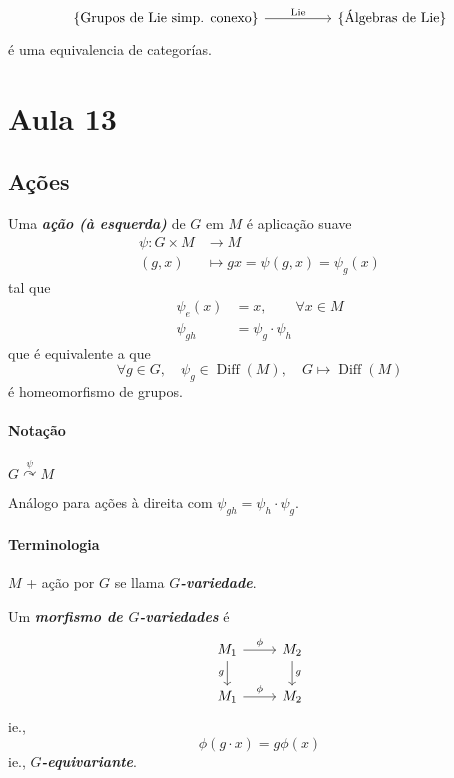 \[\begin{tikzcd}
	\{\text{Grupos de Lie simp. conexo} \} \arrow[rr,"\text{Lie} "]&&\{\text{\'Algebras de Lie} \}
\end{tikzcd}\]
\'e uma equivalencia de categor\'ias.


\section{Aula 13}

\subsection{Ações}

\begin{defn}
	Uma \textbf{\textit{ação (à esquerda)} } de $G$ em $M$ é aplicação suave
	\begin{align*}
		\psi: G\times M &\longrightarrow M \\
		(g,x) &\longmapsto gx=\psi(g,x)= \psi_{g}(x)
	\end{align*}
	tal que
	\begin{align*}
		\psi_e(x)&=x,\qquad \forall x\in M\\
		\psi_{gh}&=\psi_g\cdot \psi_h
	\end{align*}
	 que é equivalente a que
	\[\forall g\in G, \quad \psi_g\in\operatorname{Diff}(M), \quad G\mapsto \operatorname{Diff}(M)\]
	é homeomorfismo de grupos.
\end{defn}

\paragraph{Notação} $G\overset{\psi}{\curvearrowright }M$

\begin{remark}
	Análogo para ações à direita com $\psi_{gh}=\psi_h\cdot \psi_g$.
\end{remark}

\paragraph{Terminologia} $M$ + ação por $G$ se llama \textit{\textbf{$G$-variedade}}.

\begin{defn}
	Um \textit{\textbf{morfismo de  $G$-variedades}} é
\[\begin{tikzcd}
	M_1\arrow[r,"\phi"]\arrow[d,"g",swap]&M_2\arrow[d,"g"]\\
	M_1\arrow[r,"\phi"]&M_2
\end{tikzcd}\]
ie.,
\[\phi(g\cdot x)=g\phi(x)\]
ie., \textit{\textbf{$G$-equivariante}}.
\end{defn}

